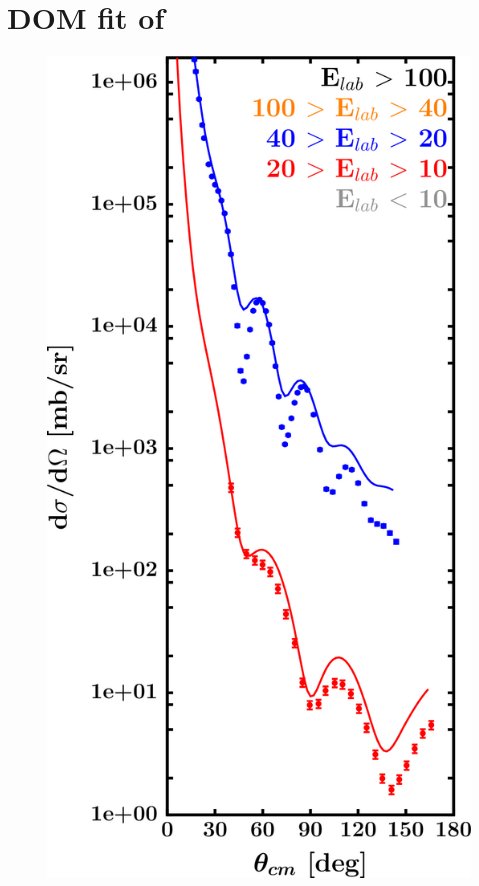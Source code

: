 \section{DOM fit of \snTwelve}
\label{sn112DOMOutput}
\begin{figure}[hbtp]
    \centering
    \begin{minipage}{0.47\textwidth}
        \centering
        \includegraphics[width=\textwidth]{figures/sn112_protonElastic.png}

\end{minipage}
\end{figure}

